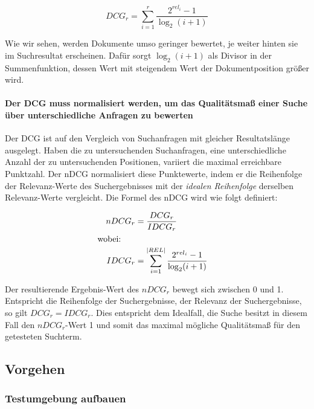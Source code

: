 \vspace{-1.5em}
\begin{equation}	
DCG_{r} = \sum\limits_{i=1}^r \frac{2^{rel_{i}} - 1}{\log_2(i+1)}
\end{equation}
\vspace{-1em}

Wie wir sehen, werden Dokumente umso geringer bewertet, je weiter hinten sie im Suchresultat erscheinen. Dafür sorgt $\log_2(i+1)$ als Divisor in der Summenfunktion, dessen Wert mit steigendem Wert der Dokumentposition größer wird.

\paragraph{Der DCG muss normalisiert werden, um das Qualitätsmaß einer Suche über unterschiedliche Anfragen zu bewerten}
Der DCG ist auf den Vergleich von Suchanfragen mit gleicher Resultatslänge ausgelegt. Haben die zu untersuchenden Suchanfragen, eine unterschiedliche Anzahl der zu untersuchenden Positionen, variiert die maximal erreichbare Punktzahl. Der nDCG normalisiert diese Punktewerte, indem er die Reihenfolge der Relevanz-Werte des Suchergebnisses mit der \textit{idealen Reihenfolge} derselben Relevanz-Werte vergleicht. Die Formel des nDCG wird wie folgt definiert:

\vspace{-.25em}
\begin{spacing}{.25}
\begin{align}
  &&	nDCG_{r} &= \frac{DCG_r}{IDCG_r} &\\
  \intertext{wobei:}
  &&	IDCG_{r} 	&= \sum\limits_{i=1}^{\vert REL \vert} \frac{2^{rel_{i}} - 1}{\log_2(i+1)}
\end{align}
\end{spacing}
\vspace{.25em}

Der resultierende Ergebnis-Wert des $nDCG_r$ bewegt sich zwischen 0 und 1. Entspricht die Reihenfolge der Suchergebnisse, der Relevanz der Suchergebnisse, so gilt $DCG_r = IDCG_r$. Dies entspricht dem Idealfall, die Suche besitzt in diesem Fall den $nDCG_r$-Wert 1 und somit das maximal mögliche Qualitätsmaß für den getesteten Suchterm.

\subsection{Vorgehen}
\label{sec:Evaluation:Aufbau:Vorgehen}

\subsubsection{Testumgebung aufbauen}
\label{sec:Evaluation:Aufbau:Vorgehen:Aufbau}

